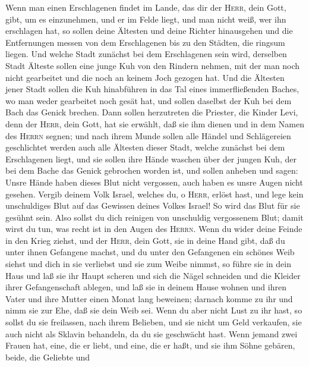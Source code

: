  Wenn man einen Erschlagenen findet im Lande, das dir der
\textsc{Herr}, dein Gott, gibt, um es einzunehmen, und er im Felde
liegt, und man nicht weiß, wer ihn erschlagen hat,  so
sollen deine Ältesten und deine Richter hinausgehen und die Entfernungen
messen von dem Erschlagenen bis zu den Städten, die ringsum liegen.
 Und welche Stadt zunächst bei dem Erschlagenen sein wird,
derselben Stadt Älteste sollen eine junge Kuh von den Rindern nehmen,
mit der man noch nicht gearbeitet und die noch an keinem Joch gezogen
hat.  Und die Ältesten jener Stadt sollen die Kuh
hinabführen in das Tal eines immerfließenden Baches, wo man weder
gearbeitet noch gesät hat, und sollen daselbst der Kuh bei dem Bach das
Genick brechen.  Dann sollen herzutreten die Priester, die
Kinder Levi, denn der \textsc{Herr}, dein Gott, hat sie erwählt, daß sie
ihm dienen und in dem Namen des \textsc{Herrn} segnen; und nach ihrem
Munde sollen alle Händel und Schlägereien geschlichtet werden
 auch alle Ältesten dieser Stadt, welche zunächst bei dem
Erschlagenen liegt, und sie sollen ihre Hände waschen über der jungen
Kuh, der bei dem Bache das Genick gebrochen worden ist, 
und sollen anheben und sagen: Unsre Hände haben dieses Blut nicht
vergossen, auch haben es unsre Augen nicht gesehen. 
Vergib deinem Volk Israel, welches du, o \textsc{Herr}, erlöst hast, und
lege kein unschuldiges Blut auf das Gewissen deines Volkes Israel! So
wird das Blut für sie gesühnt sein.  Also sollst du dich
reinigen von unschuldig vergossenem Blut; damit wirst du tun, was recht
ist in den Augen des \textsc{Herrn}.  Wenn du wider deine
Feinde in den Krieg ziehst, und der \textsc{Herr}, dein Gott, sie in
deine Hand gibt, daß du unter ihnen Gefangene machst, 
und du unter den Gefangenen ein schönes Weib siehst und dich in sie
verliebst und sie zum Weibe nimmst,  so führe sie in dein
Haus und laß sie ihr Haupt scheren und sich die Nägel schneiden
 und die Kleider ihrer Gefangenschaft ablegen, und laß
sie in deinem Hause wohnen und ihren Vater und ihre Mutter einen Monat
lang beweinen; darnach komme zu ihr und nimm sie zur Ehe, daß sie dein
Weib sei.  Wenn du aber nicht Lust zu ihr hast, so sollst
du sie freilassen, nach ihrem Belieben, und sie nicht um Geld verkaufen,
sie auch nicht als Sklavin behandeln, da du sie geschwächt hast.
 Wenn jemand zwei Frauen hat, eine, die er liebt, und
eine, die er haßt, und sie ihm Söhne gebären, beide, die Geliebte und
